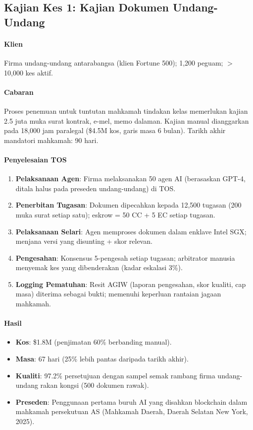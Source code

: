 \documentclass[11pt]{article}
\begin{document}
\subsection{Kajian Kes 1: Kajian Dokumen Undang-Undang}

\paragraph{Klien} Firma undang-undang antarabangsa (klien Fortune 500); 1,200 peguam; $>$10,000 kes aktif.

\paragraph{Cabaran} Proses penemuan untuk tuntutan mahkamah tindakan kelas memerlukan kajian 2.5 juta muka surat kontrak, e-mel, memo dalaman. Kajian manual dianggarkan pada 18,000 jam paralegal (\$4.5M kos, garis masa 6 bulan). Tarikh akhir mandatori mahkamah: 90 hari.

\paragraph{Penyelesaian TOS}
\begin{enumerate}[noitemsep]
  \item \textbf{Pelaksanaan Agen}: Firma melaksanakan 50 agen AI (berasaskan GPT-4, ditala halus pada preseden undang-undang) di TOS.
  \item \textbf{Penerbitan Tugasan}: Dokumen dipecahkan kepada 12,500 tugasan (200 muka surat setiap satu); eskrow = 50 CC + 5 EC setiap tugasan.
  \item \textbf{Pelaksanaan Selari}: Agen memproses dokumen dalam enklave Intel SGX; menjana versi yang disunting + skor relevan.
  \item \textbf{Pengesahan}: Konsensus 5-pengesah setiap tugasan; arbitrator manusia menyemak kes yang dibenderakan (kadar eskalasi 3\%).
  \item \textbf{Logging Pematuhan}: Resit AGIW (laporan pengesahan, skor kualiti, cap masa) diterima sebagai bukti; memenuhi keperluan rantaian jagaan mahkamah.
\end{enumerate}

\paragraph{Hasil}
\begin{itemize}[noitemsep]
  \item \textbf{Kos}: \$1.8M (penjimatan 60\% berbanding manual).
  \item \textbf{Masa}: 67 hari (25\% lebih pantas daripada tarikh akhir).
  \item \textbf{Kualiti}: 97.2\% persetujuan dengan sampel semak rambang firma undang-undang rakan kongsi (500 dokumen rawak).
  \item \textbf{Preseden}: Penggunaan pertama buruh AI yang disahkan blockchain dalam mahkamah persekutuan AS (Mahkamah Daerah, Daerah Selatan New York, 2025).
\end{itemize}
\end{document}
